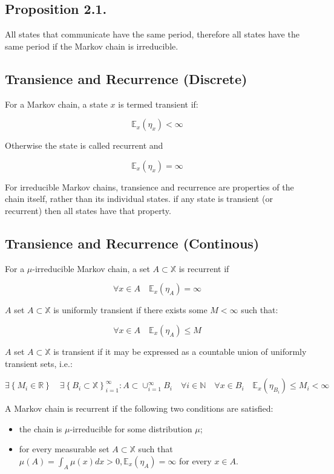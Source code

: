 \documentclass[10pt]{article}
\begin{document}
\subsection{Proposition 2.1.}
All states that communicate have the same period, therefore all states have the same period if the Markov chain is irreducible.

\subsection{Transience and Recurrence (Discrete)}
 For a Markov chain, a state $x$ is termed transient if:

$$
\mathbb{E}_{x}\left(\eta_{x}\right)<\infty
$$

Otherwise the state is called recurrent and

$$
\mathbb{E}_{x}\left(\eta_{x}\right)=\infty
$$

For irreducible Markov chains, transience and recurrence are properties of the chain itself, rather than its individual states. if any state is transient (or recurrent) then all states have that property.

\subsection{Transience and Recurrence (Continous)}
For a $\mu$-irreducible Markov chain, a set $A \subset \mathbb{X}$ is recurrent if

$$
\forall x \in A \quad \mathbb{E}_{x}\left(\eta_{A}\right)=\infty
$$

$A$ set $A \subset \mathbb{X}$ is uniformly transient if there exists some $M<\infty$ such that:

$$
\forall x \in A \quad \mathbb{E}_{x}\left(\eta_{A}\right) \leq M
$$

$A$ set $A \subset \mathbb{X}$ is transient if it may be expressed as a countable union of uniformly transient sets, i.e.:

$$
\exists\left\{M_{i} \in \mathbb{R}\right\} \quad \exists\left\{B_{i} \subset \mathbb{X}\right\}_{i=1}^{\infty}: A \subset \cup_{i=1}^{\infty} B_{i} \quad \forall i \in \mathbb{N} \quad \forall x \in B_{i} \quad \mathbb{E}_{x}\left(\eta_{B_{i}}\right) \leq M_{i}<\infty
$$

A Markov chain is recurrent if the following two conditions are satisfied:

\begin{itemize}
  \item the chain is $\mu$-irreducible for some distribution $\mu$;
  \item for every measurable set $A \subset \mathbb{X}$ such that $\mu(A)=\int_{A} \mu(x) d x>0, \mathbb{E}_{x}\left(\eta_{A}\right)=\infty$ for every $x \in A$.
\end{itemize}
\end{document}
